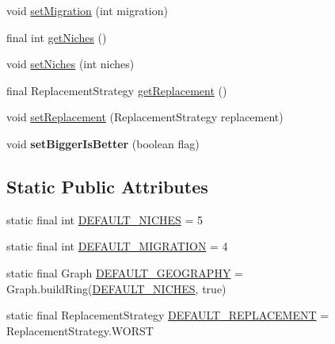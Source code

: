 \begin{DoxyCompactItemize}
void \hyperlink{classjenes_1_1algorithms_1_1_island_g_a_3_01_t_01extends_01_chromosome_01_4_a309c1fe9c74c728b2ecab37e91f09322}{set\-Migration} (int migration)
\item 
final int \hyperlink{classjenes_1_1algorithms_1_1_island_g_a_3_01_t_01extends_01_chromosome_01_4_a5642fdd072cd93a61d7ef3f1b5a806ad}{get\-Niches} ()
\item 
void \hyperlink{classjenes_1_1algorithms_1_1_island_g_a_3_01_t_01extends_01_chromosome_01_4_a5ad013b697d423948678c584adde46f7}{set\-Niches} (int niches)
\item 
final Replacement\-Strategy \hyperlink{classjenes_1_1algorithms_1_1_island_g_a_3_01_t_01extends_01_chromosome_01_4_aba40738c3ed2724093a13ec8019d2e11}{get\-Replacement} ()
\item 
void \hyperlink{classjenes_1_1algorithms_1_1_island_g_a_3_01_t_01extends_01_chromosome_01_4_a980d98b95084ac99094dac0d7d231366}{set\-Replacement} (Replacement\-Strategy replacement)
\item 
\hypertarget{classjenes_1_1algorithms_1_1_island_g_a_3_01_t_01extends_01_chromosome_01_4_aedb02e8ab567910d449869a8bd778225}{void {\bfseries set\-Bigger\-Is\-Better} (boolean flag)}\label{classjenes_1_1algorithms_1_1_island_g_a_3_01_t_01extends_01_chromosome_01_4_aedb02e8ab567910d449869a8bd778225}

\end{DoxyCompactItemize}
\subsection*{Static Public Attributes}
\begin{DoxyCompactItemize}
\item 
static final int \hyperlink{classjenes_1_1algorithms_1_1_island_g_a_3_01_t_01extends_01_chromosome_01_4_a37c9c99c1181aa1f194ad610bdb4d25f}{D\-E\-F\-A\-U\-L\-T\-\_\-\-N\-I\-C\-H\-E\-S} = 5
\item 
static final int \hyperlink{classjenes_1_1algorithms_1_1_island_g_a_3_01_t_01extends_01_chromosome_01_4_a114bd755cf3def2fffb318ab4f40569a}{D\-E\-F\-A\-U\-L\-T\-\_\-\-M\-I\-G\-R\-A\-T\-I\-O\-N} = 4
\item 
static final Graph \hyperlink{classjenes_1_1algorithms_1_1_island_g_a_3_01_t_01extends_01_chromosome_01_4_ae27b28d3f2b4f90898a4cc90a9bd1bd9}{D\-E\-F\-A\-U\-L\-T\-\_\-\-G\-E\-O\-G\-R\-A\-P\-H\-Y} = Graph.\-build\-Ring(\hyperlink{classjenes_1_1algorithms_1_1_island_g_a_3_01_t_01extends_01_chromosome_01_4_a37c9c99c1181aa1f194ad610bdb4d25f}{D\-E\-F\-A\-U\-L\-T\-\_\-\-N\-I\-C\-H\-E\-S}, true)
\item 
static final Replacement\-Strategy \hyperlink{classjenes_1_1algorithms_1_1_island_g_a_3_01_t_01extends_01_chromosome_01_4_a1fc6944fd99215488896c76893d5f3d0}{D\-E\-F\-A\-U\-L\-T\-\_\-\-R\-E\-P\-L\-A\-C\-E\-M\-E\-N\-T} = Replacement\-Strategy.\-W\-O\-R\-S\-T
\end{DoxyCompactItemize}
